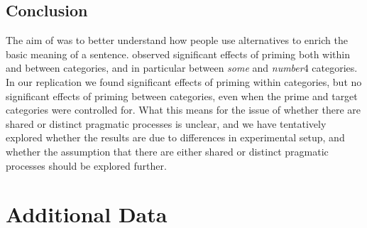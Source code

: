 \documentclass[10pt]{article}
\begin{document}
\begin{multicols}{2}
\section{Conclusion}
\label{sec:conclusion}

The aim of \textcite{Bott:2016aa} was to better understand how people use alternatives to enrich the basic meaning of a sentence.
\citeauthor{Bott:2016aa} observed significant effects of priming both within and between categories, and in particular between \emph{some} and \emph{number}4 categories.
In our replication we found significant effects of priming within categories, but no significant effects of priming between categories, even when the prime and target categories were controlled for.
What this means for the issue of whether there are shared or distinct pragmatic processes is unclear, and we have tentatively explored whether the results are due to differences in experimental setup, and whether the assumption that there are either shared or distinct pragmatic processes should be explored further.

\end{multicols}

\vfill
\printbibliography



\newpage
\appendix

\section{Additional Data}
\end{document}
